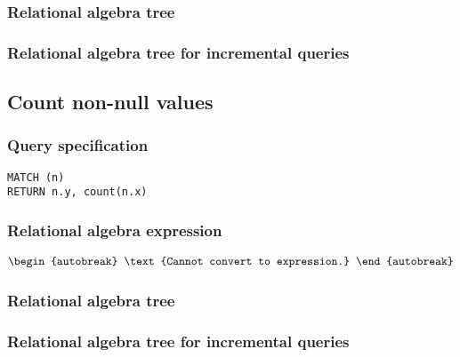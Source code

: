 \subsubsection*{Relational algebra tree}


\subsubsection*{Relational algebra tree for incremental queries}


\subsection{Count non-null values}

\subsubsection*{Query specification}

\begin{lstlisting}
MATCH (n)
RETURN n.y, count(n.x)
\end{lstlisting}

\subsubsection*{Relational algebra expression}

\begin{align*}
\begin{autobreak}
\text{Cannot convert to expression.}
\end{autobreak}
\end{align*}

\subsubsection*{Relational algebra tree}


\subsubsection*{Relational algebra tree for incremental queries}


